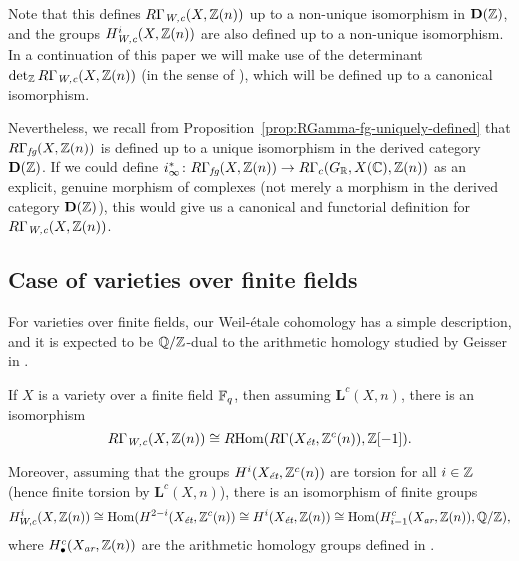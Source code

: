 \documentclass{article}
\numberwithin{equation}{section}
\begin{document}
\begin{remark}
  Note that this defines $R\Gamma_\Wc (X,\ZZ(n))$ up to a non-unique isomorphism
  in $\mathbf{D} (\ZZ)$, and the groups $H_\Wc^i (X, \ZZ (n))$ are also defined
  up to a non-unique isomorphism. In a continuation of this paper we will make
  use of the determinant $\det\nolimits_\ZZ R\Gamma_\Wc (X,\ZZ(n))$ (in the
  sense of \cite{Knudsen-Mumford-1976}), which will be defined up to a canonical
  isomorphism.

  Nevertheless, we recall from Proposition~\ref{prop:RGamma-fg-uniquely-defined}
  that $R\Gamma_\fg (X, \ZZ (n))$ is defined up to a unique isomorphism in the
  derived category $\mathbf{D} (\ZZ)$. If we could define
  $i_\infty^*\colon R\Gamma_\fg (X, \ZZ(n)) \to R\Gamma_c (G_\RR, X(\CC), \ZZ(n))$
  as an explicit, genuine morphism of complexes (not merely a morphism in the
  derived category $\mathbf{D} (\ZZ)$), this would give us a canonical and
  functorial definition for $R\Gamma_\Wc (X, \ZZ(n))$.
\end{remark}

\subsection*{Case of varieties over finite fields}

For varieties over finite fields, our Weil-étale cohomology has a simple
description, and it is expected to be $\QQ/\ZZ$-dual to the arithmetic homology
studied by Geisser in \cite{Geisser-2010-arithmetic-homology}.

\begin{proposition}
  If $X$ is a variety over a finite field $\FF_q$, then assuming
  $\mathbf{L}^c (X,n)$, there is an isomorphism
  \begin{equation}
    \label{eqn:RGamma-Wc-over-finite-fields}
    R\Gamma_\Wc (X,\ZZ(n)) \cong \RHom (R\Gamma (X_\et, \ZZ^c (n)), \ZZ [-1]).
  \end{equation}

  Moreover, assuming that the groups $H^i (X_\et, \ZZ^c (n))$ are torsion
  for all $i \in \ZZ$ (hence finite torsion by $\mathbf{L}^c (X,n)$),
  there is an isomorphism of finite groups
  \[ H^i_{W,c} (X, \ZZ (n)) \cong
    \Hom (H^{2-i} (X_\et, \ZZ^c (n)) \cong
    H^i (X_\et, \ZZ(n)) \cong
    \Hom (H_{i-1}^c (X_\ar, \ZZ (n)), \QQ/\ZZ), \]
  where $H_\bullet^c (X_\ar, \ZZ (n))$ are the arithmetic homology groups
  defined in \cite[\S 3]{Geisser-2010-arithmetic-homology}.
\end{proposition}
\end{document}
